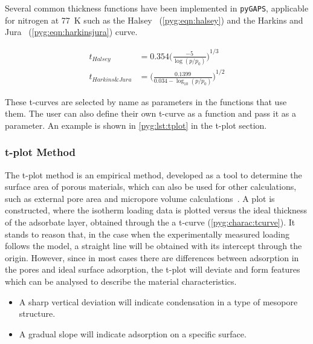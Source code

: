 Several common thickness functions have been implemented in \texttt{pyGAPS},
applicable for nitrogen at \SI{77}{\kelvin}
such as the Halsey~\cite{halseyPhysicalAdsorptionNon1948}
(\autoref{pyg:eqn:halsey}) and the
Harkins and Jura~\cite{harkinsSurfacesSolidsXIII1944a}
(\autoref{pyg:eqn:harkinsjura}) curve.

\begin{align}
	t_{Halsey}        & = 0.354 {\Big(\frac{-5}{\log(p/p_0)}\Big)}^{1/3} \label{pyg:eqn:halsey}                 \\
	t_{Harkins\&Jura} & = {\Big(\frac{0.1399}{0.034 - \log_{10}(p/p_0)}\Big)}^{1/2} \label{pyg:eqn:harkinsjura}
\end{align}

These t-curves are selected by name as parameters in
the functions that use them. The user can also define their
own t-curve as a function and pass it as a parameter. An example
is shown in \autoref{pyg:lst:tplot} in the t-plot section.

\subsubsection{t-plot Method}\label{pyg:charac:tplot}

The t-plot method is an empirical method, developed as a
tool to determine the surface area of porous materials,
which can also be used for other calculations, such as
external pore area and micropore volume
calculations~\cite{lippensStudiesPoreSystems1965}.
A plot is constructed, where the isotherm loading
data is plotted versus the ideal thickness of the adsorbate layer,
obtained through the a t-curve (\autoref{pyg:charac:tcurve}).
It stands to reason that, in the case when the experimentally measured
loading follows the model, a straight line will be obtained with its
intercept through the origin. However, since in most cases there
are differences between adsorption in the pores and ideal surface
adsorption, the t-plot will deviate and form features which can
be analysed to describe the material characteristics.

\begin{itemize}

	\item A sharp vertical deviation will indicate condensation
	      in a type of mesopore structure.
	\item A gradual slope will indicate adsorption on a specific
	      surface.

\end{itemize}

